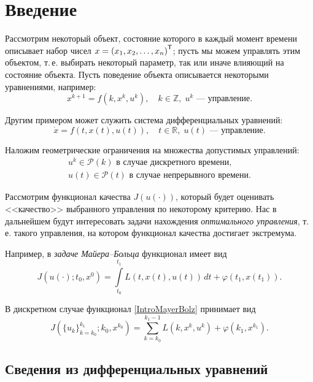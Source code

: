 \section{Введение}

Рассмотрим некоторый объект,
состояние которого в каждый момент времени описывает набор чисел
$ x =\left(x_1,x_2,\ldots,x_n\right)^{\mathsf{T}}$;
пусть мы можем управлять этим объектом,
т.\,е. выбирать некоторый параметр,
так или иначе влияющий на состояние объекта.
Пусть поведение объекта описывается некоторыми уравнениями, например:
\begin{equation*}
  x^{k + 1} = f\left(k, x^k, u^k\right),
  \quad k \in \mathbb{Z}, \; u^k\text{~--- управление.}
\end{equation*}

Другим примером может служить система дифференциальных уравнений:
\begin{equation*}
  \dot{x} = f\left(t, x(t), u(t)\right),
  \quad t \in \mathbb{R}, \; u(t)\text{~--- управление.}
\end{equation*}

Наложим геометрические ограничения на множества допустимых управлений:
\begin{gather*}
  u^k \in \mathcal P(k) \text{ в случае дискретного времени},\\
  u(t)\in \mathcal P(t) \text{ в случае непрерывного времени}.
\end{gather*}

Рассмотрим функционал качества $J\left(u(\cdot)\right)$,
который будет оценивать <<качество>>
выбранного управления по некоторому критерию.
Нас в дальнейшем будут интересовать задачи
нахождения \emph{оптимального управления},
т.\,е. такого управления, на котором функционал
качества достигает экстремума.

Например, в \emph{задаче Майера--Больца} функционал имеет вид 
\begin{equation}
\label{IntroMayerBolz}
  J\left(u(\cdot); t_0, x^0\right) =
    \int\limits_{t_0}^{t_1} L\left(t, x(t), u(t)\right)\,dt +
    \varphi(t_1, x(t_1)).
\end{equation}

В дискретном случае функционал \eqref{IntroMayerBolz} принимает вид
\begin{equation*}
  J\left(\{u_k\}_{k = k_0}^{k_1}; k_0, x^{k_0}\right) =
    \sum\limits_{k = k_0}^{k_1 - 1} L\left(k, x^k, u^k\right) +
    \varphi(k_1, x^{k_1}).
\end{equation*}

\subsection{Сведения из дифференциальных уравнений}

